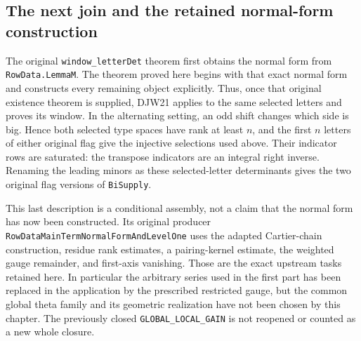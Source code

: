 \subsection{The next join and the retained normal-form construction}

The original \texttt{window\_letterDet} theorem first obtains the
normal form from \texttt{RowData.LemmaM}.  The theorem proved here
begins with that exact normal form and constructs every remaining
object explicitly.  Thus, once that original existence theorem is
supplied, DJW21 applies to the same selected letters and proves its
window.  In the alternating setting, an odd shift changes which
side is big.  Hence both selected type spaces have rank at least
$n$, and the first $n$ letters of either original flag give the
injective selections used above.  Their indicator rows are saturated:
the transpose indicators are an integral right inverse.  Renaming the
leading minors as these selected-letter determinants gives the two
original flag versions of \texttt{BiSupply}.

This last description is a conditional assembly, not a claim that
the normal form has now been constructed.  Its original producer
\texttt{RowDataMainTermNormalFormAndLevelOne} uses the adapted
Cartier-chain construction, residue rank estimates, a pairing-kernel
estimate, the weighted gauge remainder, and first-axis vanishing.
Those are the exact upstream tasks retained here.  In particular the
arbitrary series used in the first part has been replaced in the
application by the prescribed restricted gauge, but the common global
theta family and its geometric realization have not been chosen by
this chapter.  The previously closed
\texttt{GLOBAL\_LOCAL\_GAIN} is not reopened or counted as a new
whole closure.

